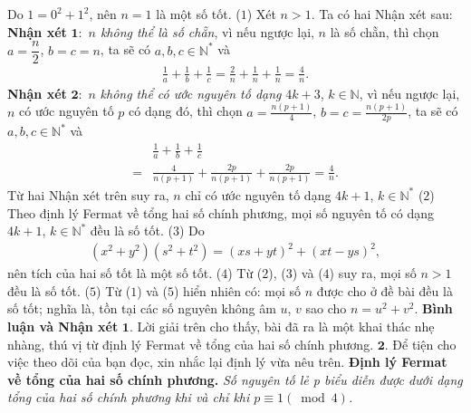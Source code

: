 \begin{multicols}{2}
	\vskip 0.05cm
	Do  $1 = 0^2 + 1^2$, nên $n = 1$ là một số tốt. \hfill ($1$)
	\vskip 0.05cm
	Xét $n > 1$.
	\vskip 0.05cm
	Ta có hai Nhận xét sau:
	\vskip 0.05cm
	\textbf{\color{thachthuctoanhoc}Nhận xét} $\pmb{1:}$ \textit{$n$ không thể là số chẵn}, vì nếu ngược lại, $n$ là số chẵn, thì chọn  $a= \dfrac{n}{2}$, \linebreak$b = c = n$, ta sẽ có $a,b,c \in \mathbb{N^*}$  và
	\begin{align*}
		\frac{1}{a} + \frac{1}{b} + \frac{1}{c} 
		= \frac{2}{n} + \frac{1}{n} + \frac{1}{n} = \frac{4}{n}.
	\end{align*}
	\textbf{\color{thachthuctoanhoc}Nhận xét} $\pmb{2:}$ $n$ \textit{không thể có ước nguyên tố dạng} $4k + 3$, $k \in \mathbb{N}$, vì nếu ngược lại, $n$ có ước nguyên tố $p$ có dạng đó, thì chọn  $a = \frac{{n\left( {p + 1} \right)}}{4}$,  $b = c = \frac{{n\left( {p + 1} \right)}}{{2p}}$, ta sẽ có $a,b,c \in \mathbb{N^*}$  và
	\begin{align*}
		&\frac{1}{a} + \frac{1}{b} + \frac{1}{c} \\
		= &\frac{4}{{n\left( {p + 1} \right)}} + \frac{{2p}}{{n\left( {p + 1} \right)}} + \frac{{2p}}{{n\left( {p + 1} \right)}} = \frac{4}{n}.
	\end{align*}
	Từ hai Nhận xét trên suy ra, $n$ chỉ có ước nguyên tố dạng $4k + 1$, $k \in \mathbb{N^*}$  \hfill        ($2$)
	\vskip 0.05cm
	Theo định lý Fermat về tổng hai số chính phương, mọi số nguyên tố có dạng $4k + 1$, $k \in \mathbb{N^*}$  đều là số tốt. \hfill ($3$)
	\vskip 0.05cm
	Do
	\begin{align*}
		\left( {{x^2} + {y^2}} \right)\!\!\left( {{s^2} + {t^2}} \right) \!=\! {\left( {xs + yt} \right)^2} \!+\! {\left( {xt - ys} \right)^2},
	\end{align*}
	nên tích của hai số tốt là một số tốt. \hfill ($4$)
	\vskip 0.05cm
	Từ ($2$), ($3$) và ($4$) suy ra, mọi số $n > 1$ đều là số tốt. ($5$)
	\vskip 0.05cm
	Từ ($1$) và ($5$) hiển nhiên có: mọi số $n$ được cho ở đề bài đều là số tốt; nghĩa là, tồn tại các số nguyên không âm $u$, $v$ sao cho $n = u^2 + v^2$.
	\vskip 0.05cm 
	\textbf{\color{thachthuctoanhoc}Bình luận và Nhận xét}
	\vskip 0.05cm
	$\pmb{1.}$ Lời giải trên cho thấy, bài đã ra là một khai thác nhẹ nhàng, thú vị từ định lý Fermat về tổng của hai số chính phương.
	\vskip 0.05cm
	$\pmb{2.}$ Để tiện cho việc theo dõi của bạn đọc, xin nhắc lại định lý vừa nêu trên.
	\vskip 0.05cm
	\textbf{\color{thachthuctoanhoc}Định lý Fermat về tổng của hai số chính phương.} \textit{Số nguyên tố lẻ p biểu diễn được dưới dạng tổng của hai số chính phương khi và chỉ khi $p \equiv 1\left( {\bmod 4} \right)$.}

\end{multicols}

